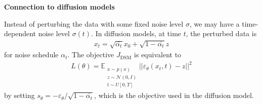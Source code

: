 \documentclass[12pt,oneside]{article}
\newcommand{\e}[0]{\varepsilon}
\newcommand{\norm}[1]{\left|\left|#1\right|\right|}
\newcommand{\CN}[0]{\mathcal{N}}
\newcommand{\BE}[0]{\mathbb{E}}
\newcommand{\ali}[1]{\begin{align*}#1\end{align*}}
\theoremstyle{plain}
\theoremstyle{remark}
\begin{document}
{\bf Connection to diffusion models\\}

Instead of perturbing the data with some fixed noise level $\sigma$, we may have a time-dependent noise level $\sigma(t)$. In diffusion models, at time $t$, the perturbed data is 
\ali{x_t = \sqrt{\bar{\alpha_t}} x_0 + \sqrt{1 - \bar{\alpha_t}} z}
for noise schedule $\alpha_t$. The objective $J_{\text{DSM}}$ is equivalent to 
\ali{L(\theta) = \BE_{\substack{x \sim p(x) \\ z \sim \CN(0, I) \\ t \sim U[0, T]}} \norm{\e_\theta(x_t, t) - z}^2}
by setting $s_\theta = - \e_\theta /  \sqrt{1 - \bar{\alpha_t}}$, which is the objective used in the diffusion model.




      
\end{document}
